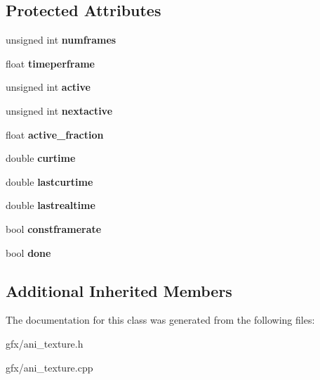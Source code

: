 \subsection*{Protected Attributes}
\begin{DoxyCompactItemize}
\item 
unsigned int {\bfseries numframes}\hypertarget{classAnimatedTexture_a48e2e0187b14b06aee186888964f2c3a}{}\label{classAnimatedTexture_a48e2e0187b14b06aee186888964f2c3a}

\item 
float {\bfseries timeperframe}\hypertarget{classAnimatedTexture_a067439be8034018648ed504ae7095225}{}\label{classAnimatedTexture_a067439be8034018648ed504ae7095225}

\item 
unsigned int {\bfseries active}\hypertarget{classAnimatedTexture_adf61c8d1d11053a915ecc6e08fc376e1}{}\label{classAnimatedTexture_adf61c8d1d11053a915ecc6e08fc376e1}

\item 
unsigned int {\bfseries nextactive}\hypertarget{classAnimatedTexture_a2f3541dd35caab396d2d2cb2369bc490}{}\label{classAnimatedTexture_a2f3541dd35caab396d2d2cb2369bc490}

\item 
float {\bfseries active\+\_\+fraction}\hypertarget{classAnimatedTexture_a5e70f6afcd062664158d6d55fee3e619}{}\label{classAnimatedTexture_a5e70f6afcd062664158d6d55fee3e619}

\item 
double {\bfseries curtime}\hypertarget{classAnimatedTexture_a9674676c28309943c8069cdbe2154a5d}{}\label{classAnimatedTexture_a9674676c28309943c8069cdbe2154a5d}

\item 
double {\bfseries lastcurtime}\hypertarget{classAnimatedTexture_a5efe18125725ae9acfbfb3fc569fdcf7}{}\label{classAnimatedTexture_a5efe18125725ae9acfbfb3fc569fdcf7}

\item 
double {\bfseries lastrealtime}\hypertarget{classAnimatedTexture_ab0ca5366f585dc2769f9792afba6cb8b}{}\label{classAnimatedTexture_ab0ca5366f585dc2769f9792afba6cb8b}

\item 
bool {\bfseries constframerate}\hypertarget{classAnimatedTexture_a4e1f0a55ee2a2f079253a855408686ca}{}\label{classAnimatedTexture_a4e1f0a55ee2a2f079253a855408686ca}

\item 
bool {\bfseries done}\hypertarget{classAnimatedTexture_a391420aa952276bef770835d05c284c6}{}\label{classAnimatedTexture_a391420aa952276bef770835d05c284c6}

\end{DoxyCompactItemize}
\subsection*{Additional Inherited Members}


The documentation for this class was generated from the following files\+:\begin{DoxyCompactItemize}
\item 
gfx/ani\+\_\+texture.\+h\item 
gfx/ani\+\_\+texture.\+cpp\end{DoxyCompactItemize}
